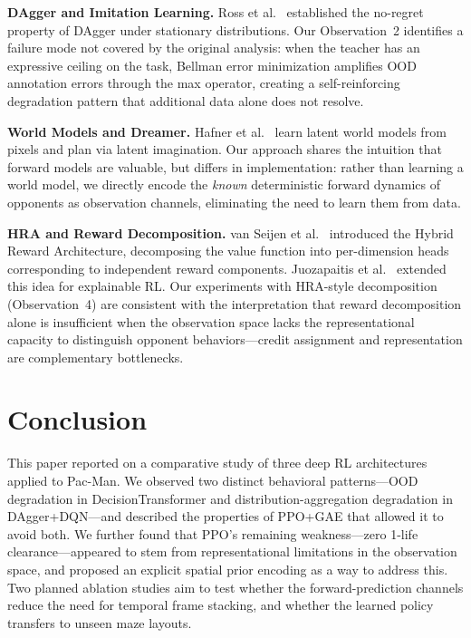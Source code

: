 \documentclass[11pt,a4paper]{article}
\theoremstyle{definition}
\begin{document}
\textbf{DAgger and Imitation Learning.}
Ross et al.\ \cite{dagger} established the no-regret property of DAgger under stationary distributions.
Our Observation~2 identifies a failure mode not covered by the original analysis: when the teacher has an expressive ceiling on the task, Bellman error minimization amplifies OOD annotation errors through the max operator, creating a self-reinforcing degradation pattern that additional data alone does not resolve.

\textbf{World Models and Dreamer.}
Hafner et al.\ \cite{dreamer,dreamerv3} learn latent world models from pixels and plan via latent imagination.
Our approach shares the intuition that forward models are valuable, but differs in implementation: rather than learning a world model, we directly encode the \textit{known} deterministic forward dynamics of opponents as observation channels, eliminating the need to learn them from data.

\textbf{HRA and Reward Decomposition.}
van Seijen et al.\ \cite{hra_maluuba} introduced the Hybrid Reward Architecture, decomposing the value function into per-dimension heads corresponding to independent reward components.
Juozapaitis et al.\ \cite{hra} extended this idea for explainable RL.
Our experiments with HRA-style decomposition (Observation~4) are consistent with the interpretation that reward decomposition alone is insufficient when the observation space lacks the representational capacity to distinguish opponent behaviors---credit assignment and representation are complementary bottlenecks.

\section{Conclusion}

This paper reported on a comparative study of three deep RL architectures applied to Pac-Man.
We observed two distinct behavioral patterns---OOD degradation in DecisionTransformer and distribution-aggregation degradation in DAgger+DQN---and described the properties of PPO+GAE that allowed it to avoid both.
We further found that PPO's remaining weakness---zero 1-life clearance---appeared to stem from representational limitations in the observation space, and proposed an explicit spatial prior encoding as a way to address this.
Two planned ablation studies aim to test whether the forward-prediction channels reduce the need for temporal frame stacking, and whether the learned policy transfers to unseen maze layouts.
\end{document}
